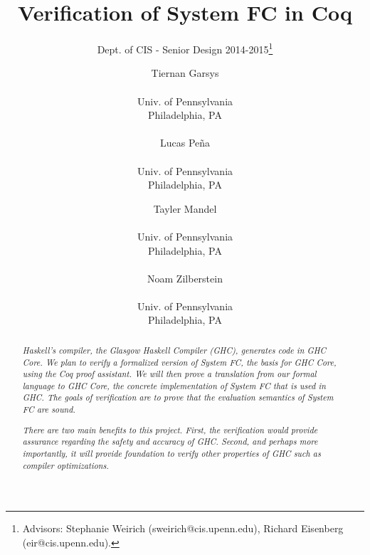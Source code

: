 \documentclass{sig-alternate}
\begin{document}
 

\title{Verification of System FC in Coq}
\subtitle{Dept. of CIS - Senior Design 2014-2015\thanks{Advisors: Stephanie Weirich (sweirich@cis.upenn.edu), Richard Eisenberg (eir@cis.upenn.edu).}}
\author{
  Tiernan Garsys \\  \\ Univ. of Pennsylvania \\ Philadelphia, PA\\\\
  Lucas Pe\~{n}a \\  \\ Univ. of Pennsylvania \\ Philadelphia, PA
  \and
  Tayler Mandel \\  \\ Univ. of Pennsylvania \\ Philadelphia, PA\\\\
  Noam Zilberstein \\  \\ Univ. of Pennsylvania \\ Philadelphia, PA
}
\date{}
\maketitle

\begin{abstract}
  \textit{
Haskell's compiler, the Glasgow Haskell Compiler (GHC), generates code in GHC Core. We plan to verify a formalized version of System FC, the basis for GHC Core, using the Coq proof assistant. We will then prove a translation from our formal language to GHC Core, the concrete implementation of System FC that is used in GHC. The goals of verification are to prove that the evaluation semantics of System FC are sound.
  }

  \textit{
There are two main benefits to this project. First, the verification would provide assurance regarding the safety and accuracy of GHC. Second, and perhaps more importantly, it will provide foundation to verify other properties of GHC such as compiler optimizations.
 }
\end{abstract}
\end{document}
